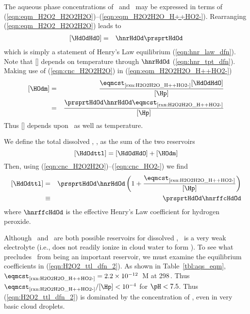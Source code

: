 \documentclass[12pt,twoside]{book}
\begin{document}
The aqueous phase concentrations of \HdOdHdO\ and \HOdm\ may be
expressed in terms of
(\ref{eqn:eqm_H2O2_H2O2H2O})--(\ref{eqn:eqm_H2O2H2O_H++HO2-}). 
Rearranging (\ref{eqn:eqm_H2O2_H2O2H2O}) leads to
\begin{eqnarray}
\label{eqn:cnc_H2O2H2O}
[\HdOdHdO] & = & \hnrHdOd \prsprtHdOd %
\end{eqnarray}
which is simply a statement of Henry's Law equilibrium
(\ref{eqn:hnr_law_dfn}). 
Note that [\HdOdHdO] depends on temperature through $\hnrHdOd$ 
(\ref{eqn:hnr_tpt_dfn}). 
Making use of (\ref{eqn:cnc_H2O2H2O}) in (\ref{eqn:eqm_H2O2H2O_H++HO2-})
\begin{eqnarray}
\label{eqn:cnc_HO2-}
[\HOdm] & = & \frac{\eqmcst_{\mbox{\scriptsize \ref{rxn:H2O2H2O_H++HO2-}}} [\HdOdHdO]}{[\Hp] } \nonumber \\
& = & \frac{\prsprtHdOd \hnrHdOd \eqmcst_{\mbox{\scriptsize \ref{rxn:H2O2H2O_H++HO2-}}}}{[\Hp] } %
\end{eqnarray}
Thus [\HOdm] depends upon \pH\ as well as temperature.

We define the total dissolved \HdOd, \HdOdttl, as the sum of the two
reservoirs  
\begin{equation}
[\HdOdttl] = [\HdOdHdO] + [\HOdm]
\label{eqn:H2O2_ttl_dfn}
\end{equation}
Then, using (\ref{eqn:cnc_H2O2H2O})--(\ref{eqn:cnc_HO2-}) we find
\begin{eqnarray}
\label{eqn:H2O2_ttl_dfn_2}
[\HdOdttl] & = & \prsprtHdOd \hnrHdOd \left(
1 + \frac{\eqmcst_{\mbox{\scriptsize \ref{rxn:H2O2H2O_H++HO2-}}}}{[\Hp] }
\right)
\\ %
\label{eqn:hnr_ffc_H2O2_dfn}
& \equiv & \prsprtHdOd \hnrffcHdOd
\end{eqnarray}
where $\hnrffcHdOd$ is the effective Henry's Law coefficient for
hydrogen peroxide.

Although \HdOdHdO\ and \HOdm\ are both possible reservoirs for
dissolved \HdOd, \HdOdHdO\ is a very weak electrolyte (i.e., does 
not readily ionize in cloud water to form \HOdm).
To see what precludes \HOdm\ from being an important reservoir, we
must examine the equilibrium coefficients in
(\ref{eqn:H2O2_ttl_dfn_2}). 
As shown in Table~\ref{tbl:aqs_eqm}, 
$\eqmcst_{\mbox{\scriptsize \ref{rxn:H2O2H2O_H++HO2-}}} = 2.2 \times 10^{-12}$~M at 298\,\K\@.
Thus $\eqmcst_{\mbox{\scriptsize \ref{rxn:H2O2H2O_H++HO2-}}} / [\Hp] < 10^{-4}$ for 
$\pH < 7.5$.
Thus (\ref{eqn:H2O2_ttl_dfn_2}) is dominated by the concentration of 
\HdOdHdO, even in very basic cloud droplets. 
\end{document}
